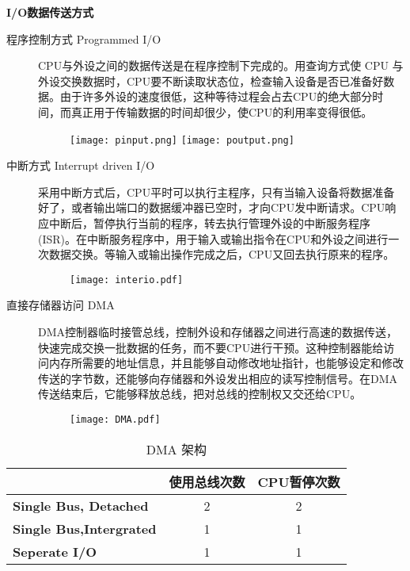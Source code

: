 \textbf{I/O数据传送方式}
\begin{description}
	\item[程序控制方式 Programmed I/O] CPU与外设之间的数据传送是在程序控制下完成的。用查询方式使 CPU 与外设交换数据时，CPU要不断读取状态位，检查输入设备是否已准备好数据。由于许多外设的速度很低，这种等待过程会占去CPU的绝大部分时间，而真正用于传输数据的时间却很少，使CPU的利用率变得很低。
	\begin{figure}[H] 
	\centering
	\texttt{[image: pinput.png]}
	\texttt{[image: poutput.png]}
	\end{figure}
	\item[中断方式 Interrupt driven I/O]采用中断方式后，CPU平时可以执行主程序，只有当输入设备将数据准备好了，或者输出端口的数据缓冲器已空时，才向CPU发中断请求。CPU响应中断后，暂停执行当前的程序，转去执行管理外设的中断服务程序(ISR)。在中断服务程序中，用于输入或输出指令在CPU和外设之间进行一次数据交换。等输入或输出操作完成之后，CPU又回去执行原来的程序。
	\begin{figure}[H]
	\texttt{[image: interio.pdf]}
	\end{figure}
	\item[直接存储器访问 DMA] DMA控制器临时接管总线，控制外设和存储器之间进行高速的数据传送，快速完成交换一批数据的任务，而不要CPU进行干预。这种控制器能给访问内存所需要的地址信息，并且能够自动修改地址指针，也能够设定和修改传送的字节数，还能够向存储器和外设发出相应的读写控制信号。在DMA传送结束后，它能够释放总线，把对总线的控制权又交还给CPU。
	\begin{figure}[H]
	\texttt{[image: DMA.pdf]}
	\end{figure}
\end{description}

\begin{table*}
	\centering
	\caption{DMA 架构}
	\begin{tabular}{|>{\bfseries}l|c|c|}
		\hline
		& \bfseries 使用总线次数 &\bfseries CPU暂停次数 \\
		\hline
		Single Bus, Detached & 2 & 2 \\
		Single Bus,Intergrated & 1 & 1 \\
		Seperate I/O & 1 & 1 \\
		\hline
	\end{tabular}
\end{table*}
